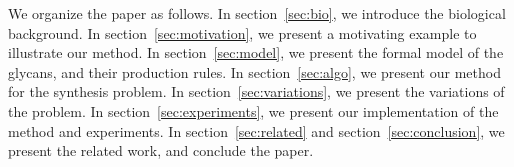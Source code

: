 We organize the paper as follows.
In section~\ref{sec:bio}, we introduce the biological background.
In section~\ref{sec:motivation}, we present a motivating example to illustrate our method.
In section~\ref{sec:model}, we present the formal model of the glycans,
and their production rules.
In section~\ref{sec:algo}, we present our method for the synthesis problem.
In section~\ref{sec:variations}, we present the variations of the problem.
In section~\ref{sec:experiments}, we present our implementation of the method and experiments. %
In section~\ref{sec:related} and section~\ref{sec:conclusion},
we present the related work, and conclude the paper.


